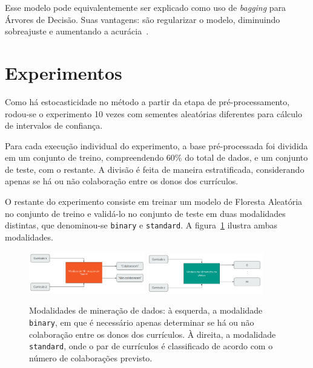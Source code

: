 \documentclass[12pt]{article}
\begin{document}
Esse modelo pode equivalentemente ser explicado como uso de \emph{bagging} para Árvores de Decisão.
Suas vantagens: são regularizar o modelo, diminuindo sobreajuste e aumentando a acurácia~\cite{random-forests}.


\section{Experimentos}
\label{sec:experiments}

Como há estocasticidade no método a partir da etapa de pré-processamento, rodou-se o experimento 10 vezes com sementes aleatórias diferentes para cálculo de intervalos de confiança. 

Para cada execução individual do experimento, a base pré-processada foi dividida em um conjunto de treino, compreendendo 60\% do total de dados, e um conjunto de teste, com o restante.
A divisão é feita de maneira estratificada, considerando apenas se há ou não colaboração entre os donos dos currículos.

O restante do experimento consiste em treinar um modelo de Floresta Aleatória no conjunto de treino e validá-lo no conjunto de teste em duas modalidades distintas, que denominou-se \texttt{binary} e \texttt{standard}.
A figura~\ref{fig:modalities} ilustra ambas modalidades.

\begin{figure}
  \begin{center}
    \includegraphics[width=0.45\textwidth]{images/binary.png}
    \hspace{10pt}
    \includegraphics[width=0.45\textwidth]{images/standard.png}
  \end{center}
  \vspace{-15pt}
  \caption{Modalidades de mineração de dados: à esquerda, a modalidade \texttt{binary}, em que é necessário apenas determinar se há ou não colaboração entre os donos dos currículos. À direita, a modalidade \texttt{standard}, onde o par de currículos é classificado de acordo com o número de colaborações previsto.}
  \label{fig:modalities}
\end{figure}
\end{document}
